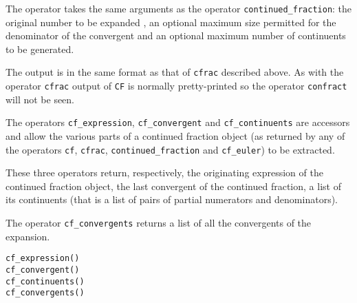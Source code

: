 The operator takes the same arguments as the operator
\texttt{continued\_fraction}: the original number to be expanded
, an optional maximum size  permitted for the
denominator of the convergent and an optional maximum number of continuents
 to be generated.

The output is in the same format as that of \texttt{cfrac} described above.
As with the operator \texttt{cfrac} output of \texttt{CF} is normally
pretty-printed so the operator \texttt{confract} will not be seen.

\hypertarget{operator:CF_EXPRESSION}{}
\hypertarget{operator:CF_CONTINUENTS}{}
\hypertarget{operator:CF_CONVERGENT}{}
\hypertarget{operator:CF_CONVERGENTS}{}

The operators \texttt{cf\_expression},
\texttt{cf\_convergent} and
\texttt{cf\_continuents} are accessors and allow
the various parts of a continued fraction object 
(as returned by any of the operators \texttt{cf}, \texttt{cfrac},
\texttt{continued\_fraction} and \texttt{cf\_euler}) to be extracted.

These three operators return, respectively, the originating
expression of the continued fraction object, the last convergent of the
continued fraction, a list of its continuents
(that is a list of pairs of partial numerators and denominators).

The operator \texttt{cf\_convergents} 
returns a list of all the convergents of the expansion.
\begin{syntaxtable}
  \texttt{cf\_expression(}\texttt{)} \\
  \texttt{cf\_convergent(}\texttt{)} \\
  \texttt{cf\_continuents(}\texttt{)} \\
  \texttt{cf\_convergents(}\texttt{)}
\end{syntaxtable}

